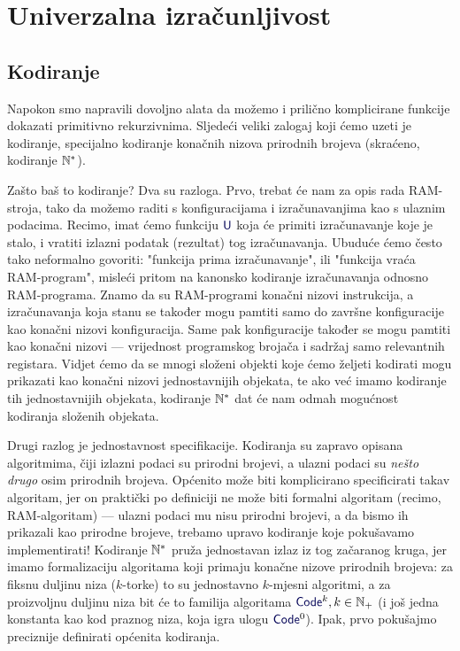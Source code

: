 \chapter{Univerzalna izračunljivost}\label{ch:univ}

\section{Kodiranje}

Napokon smo napravili dovoljno alata da možemo i prilično komplicirane funkcije dokazati primitivno rekurzivnima. Sljedeći veliki zalogaj koji ćemo uzeti je kodiranje, specijalno kodiranje konačnih nizova prirodnih brojeva (skraćeno, kodiranje ${\mathbb N}^*$).

Zašto baš to kodiranje? Dva su razloga. Prvo, trebat će nam za opis rada RAM-stroja, tako da možemo raditi s konfiguracijama i izračunavanjima kao s ulaznim podacima. Recimo, imat ćemo funkciju $\f U$ koja će primiti izračunavanje koje je stalo, i vratiti izlazni podatak (rezultat) tog izračunavanja. Ubuduće ćemo često tako neformalno govoriti: "funkcija prima izračunavanje", ili "funkcija vraća RAM-program", misleći  pritom na kanonsko kodiranje izračunavanja odnosno RAM-programa. Znamo da su RAM-programi konačni nizovi instrukcija, a izračunavanja koja stanu se također mogu pamtiti samo do završne konfiguracije kao konačni nizovi konfiguracija. Same pak konfiguracije također se mogu pamtiti kao konačni nizovi --- vrijednost programskog brojača i sadržaj samo relevantnih registara. Vidjet ćemo da se mnogi složeni objekti koje ćemo željeti kodirati mogu prikazati kao konačni nizovi jednostavnijih objekata, te ako već imamo kodiranje tih jednostavnijih objekata, kodiranje ${\mathbb N}^*$ dat će nam odmah mogućnost kodiranja složenih objekata.

Drugi razlog je jednostavnost specifikacije. Kodiranja su zapravo opisana algoritmima, čiji izlazni podaci su prirodni brojevi, a ulazni podaci su \emph{nešto drugo} osim prirodnih brojeva. Općenito može biti komplicirano specificirati takav algoritam, jer on praktički po definiciji ne može biti formalni algoritam (recimo, RAM-algoritam) --- ulazni podaci mu nisu prirodni brojevi, a da bismo ih prikazali kao prirodne brojeve, trebamo upravo kodiranje koje pokušavamo implementirati! Kodiranje ${\mathbb N}^*$ pruža jednostavan izlaz iz tog začaranog kruga, jer imamo formalizaciju algoritama koji primaju konačne nizove prirodnih brojeva: za fiksnu duljinu niza ($k$-torke) to su jednostavno $k$-mjesni algoritmi, a za proizvoljnu duljinu niza bit će to familija algoritama $\f{Code}^k,k\in\N_+$ (i još jedna konstanta kao kod praznog niza, koja igra ulogu $\f{Code}^0$). Ipak, prvo pokušajmo preciznije definirati općenita kodiranja.

